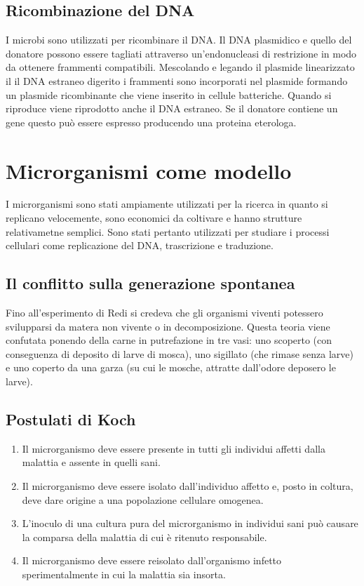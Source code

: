 \subsection{Ricombinazione del DNA}
I microbi sono utilizzati per ricombinare il DNA. Il DNA plasmidico e quello del donatore possono essere tagliati attraverso un'endonucleasi di restrizione
in modo da ottenere frammenti compatibili. Mescolando e legando il plasmide linearizzato il il DNA estraneo digerito i frammenti sono incorporati nel 
plasmide formando un plasmide ricombinante che viene inserito in cellule batteriche. Quando si riproduce viene riprodotto anche il DNA estraneo. Se il 
donatore contiene un gene questo pu\`o essere espresso producendo una proteina eterologa. 
\section{Microrganismi come modello}
I microrganismi sono stati ampiamente utilizzati per la ricerca in quanto si replicano velocemente, sono economici da coltivare e hanno strutture 
relativametne semplici. Sono stati pertanto utilizzati per studiare i processi cellulari come replicazione del DNA, trascrizione e traduzione. 
\subsection{Il conflitto sulla generazione spontanea}
Fino all'esperimento di Redi si credeva che gli organismi viventi potessero svilupparsi da matera non vivente o in decomposizione. Questa teoria viene
confutata ponendo della carne in putrefazione in tre vasi: uno scoperto (con conseguenza di deposito di larve di mosca), uno sigillato (che rimase senza 
larve) e uno coperto da una garza (su cui le mosche, attratte dall'odore deposero le larve).
\subsection{Postulati di Koch}
\begin{enumerate}
\item Il microrganismo deve essere presente in tutti gli individui affetti dalla malattia e assente in quelli sani.
\item Il microrganismo deve essere isolato dall'individuo affetto e, posto in coltura, deve dare origine a una popolazione cellulare omogenea.
\item L'inoculo di una cultura pura del microrganismo in individui sani pu\`o causare la comparsa della malattia di cui \`e ritenuto responsabile. 
\item Il microrganismo deve essere reisolato dall'organismo infetto sperimentalmente in cui la malattia sia insorta.
\end{enumerate}
